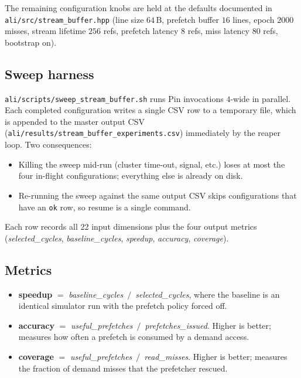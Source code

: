 \documentclass[11pt,letterpaper]{article}
\begin{document}
The remaining configuration knobs are held at the defaults documented in
\texttt{ali/src/stream\_buffer.hpp} (line size $64$\,B, prefetch buffer $16$
lines, epoch $2000$ misses, stream lifetime $256$ refs, prefetch latency
$8$ refs, miss latency $80$ refs, bootstrap on).

\subsection{Sweep harness}
\texttt{ali/scripts/sweep\_stream\_buffer.sh} runs Pin invocations
$4$-wide in parallel. Each completed configuration writes a single CSV row
to a temporary file, which is appended to the master output CSV
(\texttt{ali/results/stream\_buffer\_experiments.csv}) immediately by the
reaper loop. Two consequences:
\begin{itemize}
  \item Killing the sweep mid-run (cluster time-out, signal, etc.) loses
        at most the four in-flight configurations; everything else is
        already on disk.
  \item Re-running the sweep against the same output CSV skips
        configurations that have an \texttt{ok} row, so resume is a
        single command.
\end{itemize}
Each row records all 22 input dimensions plus the four output metrics
(\textit{selected\_cycles}, \textit{baseline\_cycles}, \textit{speedup},
\textit{accuracy}, \textit{coverage}).

\subsection{Metrics}
\begin{itemize}
  \item \textbf{speedup} $=$ \textit{baseline\_cycles}~$/$~\textit{selected\_cycles},
        where the baseline is an identical simulator run with the prefetch
        policy forced off.
  \item \textbf{accuracy} $=$ \textit{useful\_prefetches}~$/$~\textit{prefetches\_issued}.
        Higher is better; measures how often a prefetch is consumed by a
        demand access.
  \item \textbf{coverage} $=$ \textit{useful\_prefetches}~$/$~\textit{read\_misses}.
        Higher is better; measures the fraction of demand misses that the
        prefetcher rescued.
\end{itemize}

\end{document}
